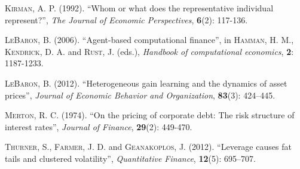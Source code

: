 \documentclass[11pt]{article}
\begin{document}
\begin{thebibliography}{100}{}
	 \textsc{Kirman, A. P.} (1992). ``Whom or what does the representative individual represent?'', \emph{The Journal of Economic Perspectives}, \textbf{6}(2): 117-136.

	 \textsc{LeBaron, B.} (2006). ``Agent-based computational finance'', in \textsc{Hamman, H. M.}, \textsc{Kendrick, D. A.} and \textsc{Rust, J.} (eds.), \emph{Handbook of computational economics}, \textbf{2}: 1187-1233.

	 \textsc{LeBaron, B.} (2012). ``Heterogeneous gain learning and the dynamics of asset prices'', \emph{Journal of Economic Behavior and Organization}, \textbf{83}(3): 424–445.

	 \textsc{Merton, R. C.} (1974). ``On the pricing of corporate debt: The risk structure of interest rates'', \emph{Journal of Finance}, \textbf{29}(2): 449-470.

	 \textsc{Thurner, S.}, \textsc{Farmer, J. D.} and \textsc{Geanakoplos, J.} (2012). ``Leverage causes fat tails and clustered volatility'', \emph{Quantitative Finance}, \textbf{12}(5): 695–707.
\end{thebibliography}
\end{document}
